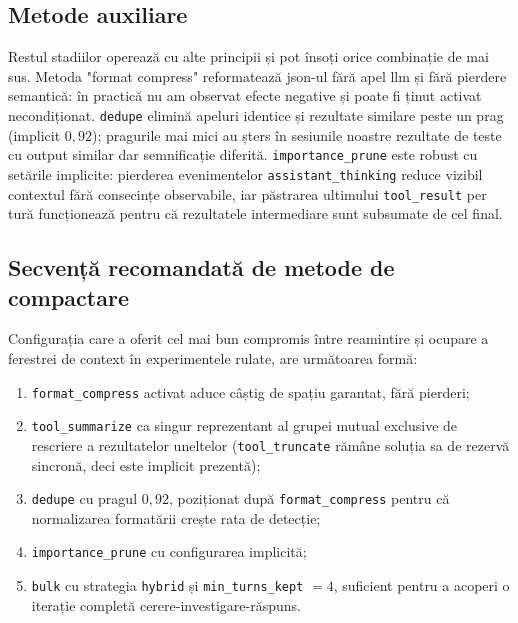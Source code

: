 \documentclass[12pt, a4paper, oneside, romanian]{teza-upb}
\begin{document}
  \subsection{Metode auxiliare}

    Restul stadiilor operează cu alte principii și pot însoți orice combinație de mai sus. Metoda "format compress" reformatează \ac{json}-ul fără apel \ac{llm} și fără pierdere semantică: în practică
    nu am observat efecte negative și poate fi ținut activat necondiționat. \texttt{dedupe} elimină apeluri identice și rezultate similare peste un prag (implicit \(0{,}92\)); pragurile mai mici
    au șters în sesiunile noastre rezultate de teste cu output similar dar semnificație diferită. \texttt{importance\_prune} este robust cu setările implicite:
    pierderea evenimentelor \texttt{assistant\_thinking} reduce vizibil contextul fără consecințe observabile, iar păstrarea ultimului \texttt{tool\_result} per tură funcționează pentru că
    rezultatele intermediare sunt subsumate de cel final.

  \subsection{Secvență recomandată de metode de compactare }

    Configurația care a oferit cel mai bun compromis între reamintire și ocupare a ferestrei de context în experimentele rulate, are următoarea formă:

    \begin{enumerate}\itemsep=0pt\parsep=0pt 
      \item \texttt{format\_compress} activat aduce câștig de spațiu garantat, fără pierderi;
      \item \texttt{tool\_summarize} ca singur reprezentant al grupei mutual exclusive de rescriere a rezultatelor uneltelor (\texttt{tool\_truncate} rămâne soluția sa de rezervă sincronă, deci este implicit prezentă);
      \item \texttt{dedupe} cu pragul \(0{,}92\), poziționat după \texttt{format\_compress} pentru că normalizarea formatării crește rata de detecție;
      \item \texttt{importance\_prune} cu configurarea implicită;
      \item \texttt{bulk} cu strategia \texttt{hybrid} și \texttt{min\_turns\_kept} \(=4\), suficient pentru a acoperi o iterație completă cerere-investigare-răspuns.
    \end{enumerate}
\end{document}
